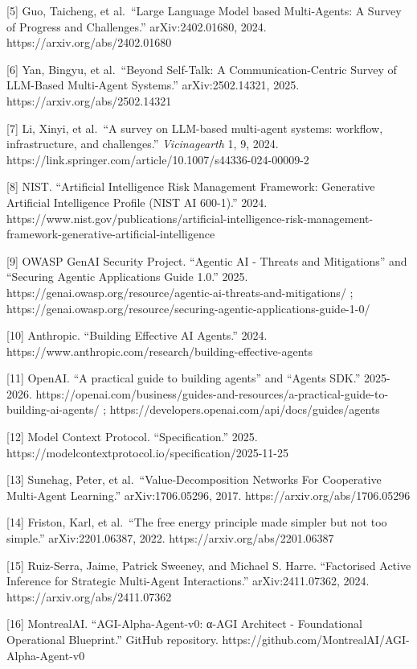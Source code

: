 \documentclass[11pt]{article}
\begin{document}
{[}5{]} Guo, Taicheng, et al.~``Large Language Model based Multi-Agents:
A Survey of Progress and Challenges.'' arXiv:2402.01680, 2024.
https://arxiv.org/abs/2402.01680

{[}6{]} Yan, Bingyu, et al.~``Beyond Self-Talk: A Communication-Centric
Survey of LLM-Based Multi-Agent Systems.'' arXiv:2502.14321, 2025.
https://arxiv.org/abs/2502.14321

{[}7{]} Li, Xinyi, et al.~``A survey on LLM-based multi-agent systems:
workflow, infrastructure, and challenges.'' \emph{Vicinagearth} 1, 9,
2024. https://link.springer.com/article/10.1007/s44336-024-00009-2

{[}8{]} NIST. ``Artificial Intelligence Risk Management Framework:
Generative Artificial Intelligence Profile (NIST AI 600-1).'' 2024.
https://www.nist.gov/publications/artificial-intelligence-risk-management-framework-generative-artificial-intelligence

{[}9{]} OWASP GenAI Security Project. ``Agentic AI - Threats and
Mitigations'' and ``Securing Agentic Applications Guide 1.0.'' 2025.
https://genai.owasp.org/resource/agentic-ai-threats-and-mitigations/ ;
https://genai.owasp.org/resource/securing-agentic-applications-guide-1-0/

{[}10{]} Anthropic. ``Building Effective AI Agents.'' 2024.
https://www.anthropic.com/research/building-effective-agents

{[}11{]} OpenAI. ``A practical guide to building agents'' and ``Agents
SDK.'' 2025-2026.
https://openai.com/business/guides-and-resources/a-practical-guide-to-building-ai-agents/
; https://developers.openai.com/api/docs/guides/agents

{[}12{]} Model Context Protocol. ``Specification.'' 2025.
https://modelcontextprotocol.io/specification/2025-11-25

{[}13{]} Sunehag, Peter, et al.~``Value-Decomposition Networks For
Cooperative Multi-Agent Learning.'' arXiv:1706.05296, 2017.
https://arxiv.org/abs/1706.05296

{[}14{]} Friston, Karl, et al.~``The free energy principle made simpler
but not too simple.'' arXiv:2201.06387, 2022.
https://arxiv.org/abs/2201.06387

{[}15{]} Ruiz-Serra, Jaime, Patrick Sweeney, and Michael S. Harre.
``Factorised Active Inference for Strategic Multi-Agent Interactions.''
arXiv:2411.07362, 2024. https://arxiv.org/abs/2411.07362

{[}16{]} MontrealAI. ``AGI-Alpha-Agent-v0: α-AGI Architect -
Foundational Operational Blueprint.'' GitHub repository.
https://github.com/MontrealAI/AGI-Alpha-Agent-v0
\end{document}
